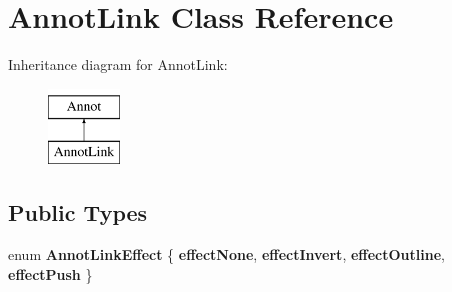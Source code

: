 \hypertarget{class_annot_link}{}\section{Annot\+Link Class Reference}
\label{class_annot_link}
Inheritance diagram for Annot\+Link\+:\begin{figure}[H]
\begin{center}
\leavevmode
\includegraphics[height=2.000000cm]{class_annot_link}
\end{center}
\end{figure}
\subsection*{Public Types}
\begin{DoxyCompactItemize}
\item 
\mbox{\label{class_annot_link_a0a81a433c28ff6003e4842baab81be52}} 
enum {\bfseries Annot\+Link\+Effect} \{ {\bfseries effect\+None}, 
{\bfseries effect\+Invert}, 
{\bfseries effect\+Outline}, 
{\bfseries effect\+Push}
 \}
\end{DoxyCompactItemize}
